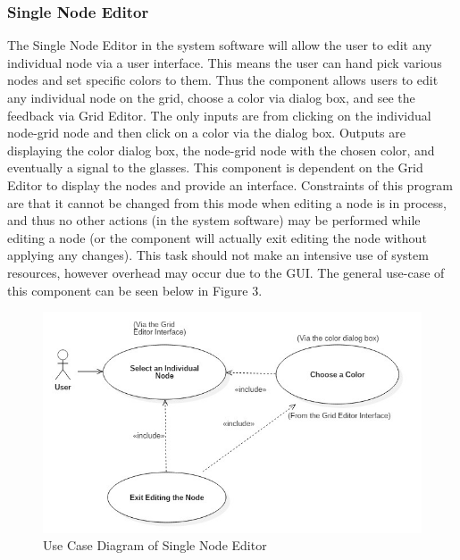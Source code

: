 \documentclass[12pt]{article}
\begin{document}
	\subsubsection {Single Node Editor}
  	The Single Node Editor in the system software will allow the user to edit any individual node via a user interface. This means the user can hand pick various nodes and set specific colors to them. Thus the component allows users to edit any individual node on the grid, choose a color via dialog box, and see the feedback via Grid Editor. The only inputs are from clicking on the individual node-grid node and then click on a color via the dialog box. Outputs are displaying the color dialog box, the node-grid node with the chosen color, and eventually a signal to the glasses. This component is dependent on the Grid Editor to display the nodes and provide an interface. Constraints of this program are that it cannot be changed from this mode when editing a node is in process, and thus no other actions (in the system software) may be performed while editing a node (or the component will actually exit editing the node without applying any changes). This task should not make an intensive use of system resources, however overhead may occur due to the GUI. The general use-case of this component can be seen below in Figure 3.  	
  	\begin{figure}[ht!]
  		\centering
  		\includegraphics[width=\linewidth]{SingleNodeEditorDiagram.JPG}
  		\caption{Use Case Diagram of Single Node Editor \label{overflow}}
  	\end{figure}
  
\end{document}
